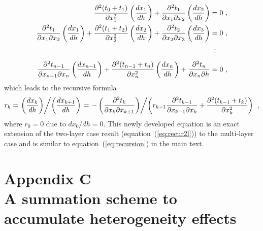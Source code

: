 \begin{align}
 \frac{\partial^2 (t_0 + t_1)}{\partial x_1^2} \left( \frac{d x_1}{d h}\right) + \frac{\partial^2 t_1}{\partial x_1 \partial x_2} \left( \frac{d x_2}{d h}\right) & = 0~, \\
 \nonumber
\frac{\partial^2 t_{1}}{\partial x_{1} \partial x_2} \left( \frac{d x_{1}}{d h}\right) + \frac{\partial^2 (t_{1} + t_2)}{\partial x_2^2} \left( \frac{d x_2}{d h}\right) + \frac{\partial^2 t_2}{\partial x_2 \partial x_{3}}\left( \frac{d x_{3}}{d h}\right) & = 0~, \\
   &\;\;\vdots \notag \\
\nonumber
\frac{\partial^2 t_{n-1}}{\partial x_{n-1} \partial x_n} \left( \frac{d x_{n-1}}{d h}\right) + \frac{\partial^2 (t_{n-1} + t_n)}{\partial x_n^2} \left( \frac{d x_n}{d h}\right) + \frac{\partial^2 t_n}{\partial x_n \partial h} &= 0~, 
\end{align}
which leads to the recursive formula 
\begin{equation}
\label{eq:rnl}
 r_k = \left. \left( \frac{d x_k}{d h}\right) \middle/ \left( \frac{d x_{k+1}}{d h}\right)\right. = \left. -\left( \frac{\partial^2 t_k}{\partial x_k \partial x_{k+1}} \right) \middle/ \left(  r_{k-1} \frac{\partial^2 t_{k-1}}{\partial x_{k-1} \partial x_k}  + \frac{\partial^2 (t_{k-1} + t_k)}{\partial x_k^2} \right)\right. ~,
\end{equation}
where $r_0 = 0$ due to $dx_0/dh = 0$. This newly developed equation is an exact extension of the two-layer case result (equation~(\ref{eq:recur2l})) to the multi-layer case and is similar to equation~(\ref{eq:recursion}) in the main text.


\section{Appendix C \\ A summation scheme to accumulate heterogeneity effects}


